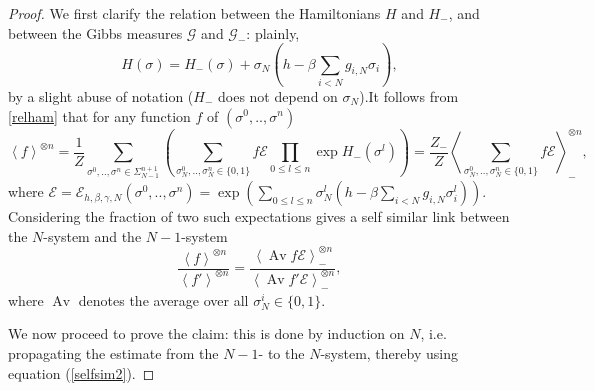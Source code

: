 \documentclass[a4paper,12pt,oneside,reqno]{amsart}
\numberwithin{equation}{section}
\begin{document}
\begin{proof}
We first clarify the relation between the Hamiltonians $H$ and $H_{-}$, and between the Gibbs measures $\mathcal G$ and $\mathcal G_{-}$: plainly, 
\begin{equation}\label{relham} H(\sigma) = H_{-}\left(\sigma\right) + \sigma_N \left(h-\beta\sum\limits_{i<N} g_{i,N}\sigma_i \right), \end{equation}
by a slight abuse of notation ($H_{-}$ does not depend on $\sigma_N$).It follows from \eqref{relham} that for any function $f$ of $\left(\sigma^0,..,\sigma^n\right)$
$$ \left<f\right>^{\otimes n} =  \frac{1}{Z}\sum\limits_{\sigma^0,..,\sigma^n\in\Sigma^{n+1}_{N-1}}\left(\sum\limits_{\sigma^0_N,..,\sigma^n_N\in\{0,1\}} f \mathcal{E}\prod\limits_{0\leq l\leq n}\exp H_{-}\left(\sigma^l \right)\right) = \frac{Z_{-}}{Z}\left<\sum\limits_{\sigma^0_N,..,\sigma^n_N\in\{0,1\}} f \mathcal{E}\right>_{-}^{\otimes n},$$
where $\mathcal{E} = \mathcal{E}_{h,\beta,\gamma,N}\left(\sigma^0,..,\sigma^n \right) =  \exp\left(\sum\limits_{0\leq l\leq n}\sigma^l_N \left(h-\beta\sum\limits_{i<N} g_{i,N}\sigma_i^l\right) \right)$. Considering the fraction of two such expectations gives a self similar link between the $N$-system and the $N-1$-system
\begin{equation}\label{selfsim2}\frac{\left<f\right>^{\otimes n}}{\left<f'\right>^{\otimes n}} = \frac{\left<\operatorname{Av} f \mathcal{E}\right>_{-}^{\otimes n}}{\left<\operatorname{Av} f' \mathcal{E}\right>_{-}^{\otimes n}}, \end{equation}
where $\operatorname{Av}$ denotes the average over all $\sigma_N^i\in \{0,1\}$.

We now proceed to prove the claim: this is done by induction on $N$, i.e. propagating the estimate from the $N-1$- to the $N$-system, thereby using equation (\ref{selfsim2}).


\end{proof}
\end{document}
